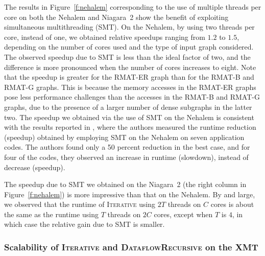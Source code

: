 \documentclass{article}
\begin{document}
The results in Figure~\ref{f:nehalem} corresponding to the use of multiple threads per core 
on both the Nehalem and Niagara~2 show the benefit of exploiting simultaneous multithreading (SMT).
On the Nehalem, by using two threads per core, instead of one,
we obtained relative speedups ranging  from $1.2$ to $1.5$, depending on the number of cores 
used and the type of input graph considered.
The observed speedup due to SMT is less than the ideal factor of two, and the difference
is more pronounced when the number of cores increases to  eight. 
Note that the speedup is greater for the RMAT-ER graph than for the RMAT-B and RMAT-G graphs.
This is because the memory accesses in the RMAT-ER graphs
pose less performance challenges than the accesses in the RMAT-B and RMAT-G graphs, 
due to the presence of a larger number of dense subgraphs in the latter two. 
The speedup we obtained via the use of SMT on the Nehalem is
consistent with the results reported in \cite{Barker},
where the authors measured the runtime reduction (speedup) obtained by 
employing SMT on the Nehalem on seven application codes. 
The authors found only a 50 percent reduction in the best case, 
and for four of the codes, they observed an increase in runtime (slowdown), 
instead of decrease (speedup). 

The speedup due to SMT we obtained on the Niagara~2 
(the right column in Figure~\ref{f:nehalem}) is more impressive than that on the Nehalem. 
By and large, we observed that the runtime of \textsc{Iterative} using $2T$ threads on $C$ cores is
about the same as the runtime using $T$ threads on $2C$ cores, except when  $T$ is $4$, in which case the relative gain due to SMT is smaller.


\subsubsection{Scalability of \textsc{Iterative} and \textsc{DataflowRecursive}
on the XMT}
\end{document}

